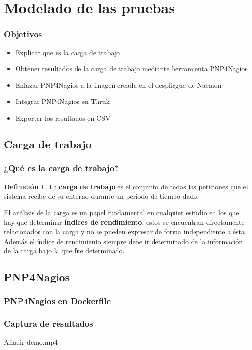 \documentclass{beamer}
\theoremstyle{plain}
\theoremstyle{definition}
\newtheorem{defn}[thm]{Definici\'{o}n}
\theoremstyle{plain}
\theoremstyle{definition}
\theoremstyle{remark}
\theoremstyle{definition}
\begin{document}
\section{Modelado de las pruebas} %
\begin{frame}
	
	\frametitle{Objetivos}
	\begin{itemize}
		\item Explicar que es la carga de trabajo
		\item Obtener resultados de la carga de trabajo mediante herramienta PNP4Nagios
		\item Enlazar PNP4Nagios a la imagen creada en el despliegue de Naemon
		\item Integrar PNP4Nagios en Thruk
		\item Exportar los resultados en CSV			
	\end{itemize}
	
\end{frame}

\subsection{Carga de trabajo}
\begin{frame}
	\frametitle{¿Qué es la carga de trabajo?}
	\begin{defn}
		La \textbf{carga de trabajo} es el conjunto de todas las peticiones que el sistema recibe de su entorno
		durante un periodo de tiempo dado.
	\end{defn}
El análisis de la carga es un papel fundamental en cualquier
estudio en los que hay que determinar \textbf{índices de rendimiento}, estos se
encuentran directamente relacionados con la carga y no se pueden expresar
de forma independiente a ésta. Además el índice de rendimiento siempre debe
ir determinado de la información de la carga bajo la que fue determinado.
	
\end{frame}
\subsection{PNP4Nagios}

\begin{frame}
	\frametitle{PNP4Nagios en Dockerfile}
\end{frame}
\begin{frame}
	\frametitle{Captura de resultados}
	Añadir demo.mp4
\end{frame}
\end{document}
